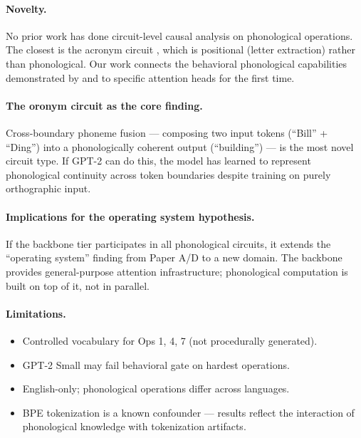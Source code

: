 \documentclass{article}
\begin{document}
\paragraph{Novelty.}
No prior work has done circuit-level causal analysis on phonological
operations. The closest is the acronym circuit \citep{garcia2024acronym},
which is positional (letter extraction) rather than phonological. Our work
connects the behavioral phonological capabilities demonstrated by
\citet{suvarna2024phonologybench} and \citet{liao2026tokenization} to specific
attention heads for the first time.

\paragraph{The oronym circuit as the core finding.}
Cross-boundary phoneme fusion --- composing two input tokens (``Bill'' +
``Ding'') into a phonologically coherent output (``building'') --- is the
most novel circuit type. If GPT-2 can do this, the model has learned to
represent phonological continuity across token boundaries despite training
on purely orthographic input.

\paragraph{Implications for the operating system hypothesis.}
If the backbone tier participates in all phonological circuits, it extends
the ``operating system'' finding from Paper A/D to a new domain. The backbone
provides general-purpose attention infrastructure; phonological computation is
built on top of it, not in parallel.

\paragraph{Limitations.}
\begin{itemize}[leftmargin=*,itemsep=2pt]
  \item Controlled vocabulary for Ops 1, 4, 7 (not procedurally generated).
  \item GPT-2 Small may fail behavioral gate on hardest operations.
  \item English-only; phonological operations differ across languages.
  \item BPE tokenization is a known confounder --- results reflect the
  interaction of phonological knowledge with tokenization artifacts.
\end{itemize}
\end{document}
